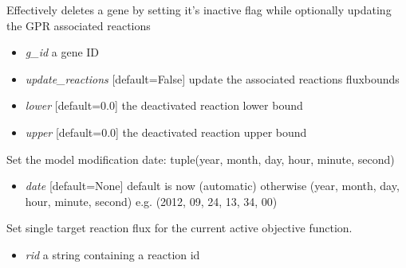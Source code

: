 \documentclass[a4paper,11pt,english]{sphinxmanual}
\begin{document}
\begin{fulllineitems}
\begin{fulllineitems}
\end{fulllineitems}


\begin{fulllineitems}
\label{modules_doc:cbmpy.CBModel.Model.setGeneInactive}
Effectively deletes a gene by setting it's inactive flag while optionally updating the GPR associated reactions
\begin{itemize}
\item {} 
\emph{g\_id} a gene ID

\item {} 
\emph{update\_reactions} {[}default=False{]} update the associated reactions fluxbounds

\item {} 
\emph{lower} {[}default=0.0{]} the deactivated reaction lower bound

\item {} 
\emph{upper} {[}default=0.0{]} the deactivated reaction upper bound

\end{itemize}

\end{fulllineitems}


\begin{fulllineitems}
\label{modules_doc:cbmpy.CBModel.Model.setModifiedDate}
Set the model modification date: tuple(year, month, day, hour, minute, second)
\begin{itemize}
\item {} 
\emph{date} {[}default=None{]} default is now (automatic) otherwise (year, month, day, hour, minute, second) e.g. (2012, 09, 24, 13, 34, 00)

\end{itemize}

\end{fulllineitems}


\begin{fulllineitems}
\label{modules_doc:cbmpy.CBModel.Model.setObjectiveFlux}
Set single target reaction flux for the current active objective function.
\begin{itemize}
\item {} 
\emph{rid} a string containing a reaction id


\end{itemize}
\end{fulllineitems}
\end{fulllineitems}
\end{document}
